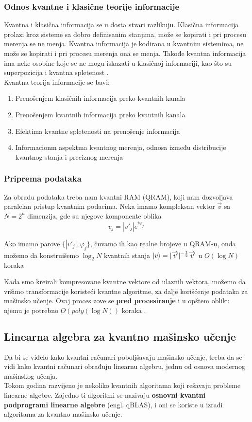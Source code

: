 \documentclass[12pt, letterpaper, oneside]{article}
\begin{document}
\subsubsection*{Odnos kvantne i klasične teorije informacije}
Kvantna i klasična informacija se u dosta stvari razlikuju.  Klasična informacija prolazi kroz sisteme sa dobro definisanim stanjima, može se kopirati i pri procesu merenja se ne menja.
Kvantna informacija je kodirana u kvantnim sistemima, ne može se kopirati i pri procesu merenja ona se menja. Takođe kvantna informacija ima neke osobine koje se ne
mogu iskazati u klasičnoj informaciji, kao što su superpozicija i kvantna spletenost \cite{Classical&quantum_info}. \\
Kvantna teorija informacije se bavi: 
\begin{enumerate}
    \item Prenošenjem klasičnih informacija preko kvantnih kanala
    \item Prenošenjem kvantnih informacija preko kvantnih kanala
    \item Efektima kvantne spletenosti na prenošenje informacija
    \item Informacionm aspektma kvantnog merenja, odnosa između distribucije \\
    kvantnog stanja i preciznog merenja
\end{enumerate}
\subsubsection{Priprema podataka}
Za obradu podataka treba nam kvantni RAM (QRAM), koji nam dozvoljava paralelan pristup kvantnim podacima.
Neka imamo kompleksan vektor $\overrightarrow{v}$ sa $N=2^n$ dimenzija, gde su njegove komponente oblika 
\[
    v_j = |v'_j|e^{i\varphi_j}
\]

Ako imamo parove $\{|v'_j|,\varphi_j\}$, čuvamo ih kao realne brojeve u QRAM-u, onda možemo da konstruišemo
$\log_{2}N$ kvantnih stanja $\ket{v} = |\overrightarrow{v}|^{-\frac{1}{2}}\overrightarrow{v}$ u $O(\log N)$ koraka

Kada smo kreirali kompresovane kvantne vektore od ulaznih vektora, možemo da vršimo transformacije koristeći kvantne algoritme, za dalje korišćenje podataka za mašinsko učenje.
Ovaj proces zove se \textbf{pred procesiranje} i u opštem obliku njemu je potrebno $O(poly(\log{}N))$ koraka \cite{lloyd2013quantum}.

\subsection{Linearna algebra za kvantno mašinsko učenje}
Da bi se videlo kako kvantni računari poboljšavaju mašinsko učenje, treba da se vidi kako kvantni računari obrađuju linearnu algebru, jednu od osnova modernog mašinskog učenja. \\
Tokom godina razvijeno je nekoliko kvantnih algoritama koji rešavaju probleme linearne algebre.
Zajedno ti algoritmi se nazivaju \textbf{osnovni kvantni podprogrami linearne algebre} (engl. qBLAS), i oni se koriste u izradi algoritama za kvantno mašinsko učenje.
\end{document}
